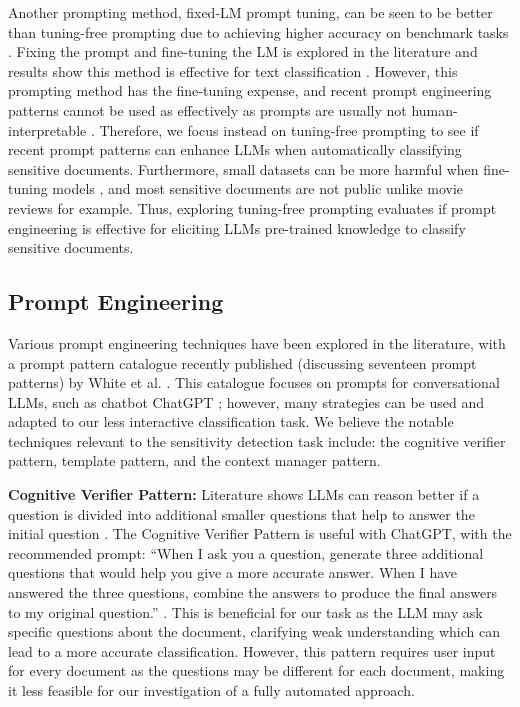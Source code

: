 Another prompting method, fixed-LM prompt tuning, can be seen to be better than tuning-free prompting due to achieving higher accuracy on benchmark tasks \cite{liu2023pre}. Fixing the prompt and fine-tuning the LM is explored in the literature and results show this method is effective for text classification \cite{yin2019benchmarking}. However, this prompting method has the fine-tuning expense, and recent prompt engineering patterns \cite{white2023prompt} cannot be used as effectively as prompts are usually not human-interpretable \cite{liu2023pre}. Therefore, we focus instead on tuning-free prompting to see if recent prompt patterns can enhance LLMs when automatically classifying sensitive documents. Furthermore, small datasets can be more harmful when fine-tuning models \cite{zhao2023survey}, and most sensitive documents are not public unlike movie reviews for example. Thus, exploring tuning-free prompting evaluates if prompt engineering is effective for eliciting LLMs pre-trained knowledge to classify sensitive documents.

\subsection{Prompt Engineering}
\label{sec:background:prompt_engineering}
Various prompt engineering techniques have been explored in the literature, with a prompt pattern catalogue recently published (discussing seventeen prompt patterns) by White et al. \cite{white2023prompt}. This catalogue focuses on prompts for conversational LLMs, such as chatbot ChatGPT \cite{brown2020language}; however, many strategies can be used and adapted to our less interactive classification task. We believe the notable techniques relevant to the sensitivity detection task include: the cognitive verifier pattern, template pattern, and the context manager pattern.

\textbf{Cognitive Verifier Pattern:} Literature shows LLMs can reason better if a question is divided into additional smaller questions that help to answer the initial question \cite{zhou2022large}. The Cognitive Verifier Pattern is useful with ChatGPT, with the recommended prompt: “When I ask you a question, generate three additional questions that would help you give a more accurate answer. When I have answered the three questions, combine the answers to produce the final answers to my original question.” \cite{white2023prompt}. This is beneficial for our task as the LLM may ask specific questions about the document, clarifying weak understanding which can lead to a more accurate classification. However, this pattern requires user input for every document as the questions may be different for each document, making it less feasible for our investigation of a fully automated approach.

